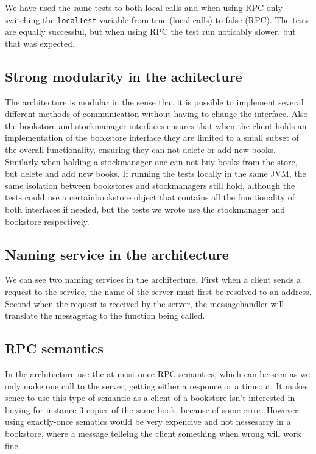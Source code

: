 \documentclass{article}
\theoremstyle{plain}
\theoremstyle{nonumberplain}
\begin{document}
We have used the same tests to both local calls and when using RPC only switching the \verb|localTest| variable from true (local calls) to false (RPC). The tests are equally successful, but when using RPC the test run noticably slower, but that was expected. 

\subsection{Strong modularity in the achitecture}

The architecture is modular in the sense that it is possible to implement several different methods of communication without having to change the interface. 
Also the bookstore and stockmanager interfaces ensures that when the client holds an implementation of the bookstore interface they are limited to a small subset of the overall functionality, ensuring they can not delete or add new books. Similarly when holding a stockmanager one can not buy books from the store, but delete and add new books.
If running the tests locally in the same JVM, the same isolation between bookstores and stockmanagers still hold, although the tests could use a certainbookstore object that contains all the functionality of both interfaces if needed, but the tests we wrote use the stockmanager and bookstore respectively.

\subsection{Naming service in the architecture}

We can see two naming services in the architecture. First when a client sends a request to the service, the name of the server must first be resolved to an address. Second when the request is received by the server, the messagehandler will translate the messagetag to the function being called.

\subsection{RPC semantics}

In the architecture use the at-most-once RPC semantics, which can be seen as we only make one call to the server, getting either a responce or a timeout.
It makes sence to use this type of semantic as a client of a bookstore isn't interested in buying for instance 3 copies of the same book, because of some error. However using exactly-once sematics would be very expencive and not nessesarry in a bookstore, where a message telleing the client something when wrong will work fine. 
\end{document}
